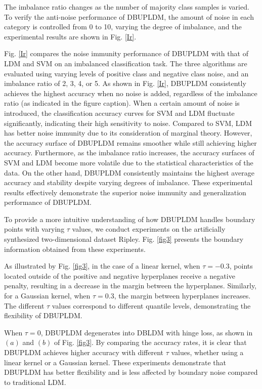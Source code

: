 \documentclass[a4paper]{cas-sc}
\begin{document}
The imbalance ratio changes as the number of majority class samples is varied. To verify the anti-noise performance of DBUPLDM, the amount of noise in each category is controlled from 0 to 10, varying the degree of imbalance, and the experimental results are shown in Fig. \ref{Ir}.

Fig. \ref{Ir} compares the noise immunity performance of DBUPLDM with that of LDM and SVM on an imbalanced classification task. The three algorithms are evaluated using varying levels of positive class and negative class noise, and an imbalance ratio of 2, 3, 4, or 5. As shown in Fig. \ref{Ir}, DBUPLDM consistently achieves the highest accuracy when no noise is added, regardless of the imbalance ratio (as indicated in the figure caption). When a certain amount of noise is introduced, the classification accuracy curves for SVM and LDM fluctuate significantly, indicating their high sensitivity to noise. Compared to SVM, LDM has better noise immunity due to its consideration of marginal theory. However, the accuracy surface of DBUPLDM remains smoother while still achieving higher accuracy. Furthermore, as the imbalance ratio increases, the accuracy surfaces of SVM and LDM become more volatile due to the statistical characteristics of the data. On the other hand, DBUPLDM consistently maintains the highest average accuracy and stability despite varying degrees of imbalance. These experimental results effectively demonstrate the superior noise immunity and generalization performance of DBUPLDM.

To provide a more intuitive understanding of how DBUPLDM handles boundary points with varying $\tau$ values, we conduct experiments on the artificially synthesized two-dimensional dataset Ripley. Fig. \ref{fig3} presents the boundary information obtained from these experiments.

As illustrated by Fig. \ref{fig3}, in the case of a linear kernel, when $\tau=-0.3$, points located outside of the positive and negative hyperplanes receive a negative penalty, resulting in a decrease in the margin between the hyperplanes. Similarly, for a Gaussian kernel, when $\tau=0.3$, the margin between hyperplanes increases. The different $\tau$ values correspond to different quantile levels, demonstrating the flexibility of DBUPLDM.

When $\tau=0$, DBUPLDM degenerates into DBLDM with hinge loss, as shown in $(a)$ and $(b)$ of Fig. \ref{fig3}. By comparing the accuracy rates, it is clear that DBUPLDM achieves higher accuracy with different $\tau$ values, whether using a linear kernel or a Gaussian kernel. These experiments demonstrate that DBUPLDM has better flexibility and is less affected by boundary noise compared to traditional LDM.
\end{document}
